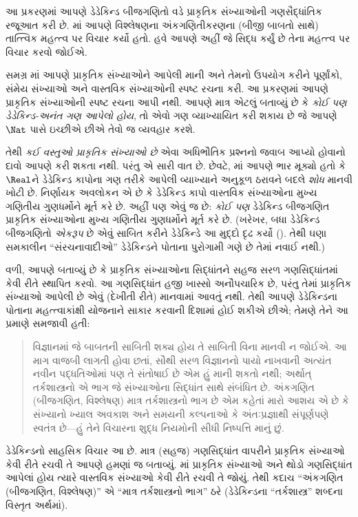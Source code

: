 \begingroup
\makeatletter{}\makeatother


\label{guunit:OLP-0053}


આ પ્રકરણમાં આપણે ડેડેકિન્ડ બીજગણિતો વડે પ્રાકૃતિક સંખ્યાઓની
ગણસૈદ્ધાંતિક રજૂઆત કરી છે. માં આપણે
વિશ્લેષણના અંકગણિતીકરણના (બીજી બાબતો સાથે) તાત્ત્વિક મહત્ત્વ પર
વિચાર કર્યો હતો. હવે આપણે અહીં જે સિદ્ધ કર્યું છે તેના મહત્ત્વ પર
વિચાર કરવો જોઈએ.

સમગ્ર માં આપણે પ્રાકૃતિક સંખ્યાઓને આપેલી
માની અને તેમનો ઉપયોગ કરીને પૂર્ણાંકો, સંમેય સંખ્યાઓ અને વાસ્તવિક
સંખ્યાઓની સ્પષ્ટ રચના કરી. આ પ્રકરણમાં આપણે પ્રાકૃતિક સંખ્યાઓની સ્પષ્ટ
રચના આપી નથી. આપણે માત્ર એટલું બતાવ્યું છે કે \emph{કોઈ પણ
ડેડેકિન્ડ-અનંત ગણ આપેલો હોય}, તો એવો ગણ વ્યાખ્યાયિત કરી શકાય છે જે
આપણે~$\Nat$ પાસે ઇચ્છીએ છીએ તેવો જ વ્યવહાર કરશે.

તેથી \emph{કઈ વસ્તુઓ પ્રાકૃતિક સંખ્યાઓ છે} એવા અધિભૌતિક પ્રશ્નનો
જવાબ આપ્યો હોવાનો દાવો આપણે કરી શકતા નથી. પરંતુ એ સારી વાત છે. છેવટે,
માં આપણે ભાર મૂક્યો હતો કે
$\Real$ને ડેડેકિન્ડ કાપોના ગણ તરીકે આપેલી વ્યાખ્યાને અનુકૂળ ઠરાવને
બદલે \emph{શોધ} માનવી ખોટી છે. નિર્ણાયક અવલોકન એ છે કે ડેડેકિન્ડ
કાપો વાસ્તવિક સંખ્યાઓના મુખ્ય ગણિતીય ગુણધર્મોને મૂર્ત કરે છે. અહીં
પણ એવું જ છે: \emph{કોઈ પણ} ડેડેકિન્ડ બીજગણિત પ્રાકૃતિક સંખ્યાઓના
મુખ્ય ગણિતીય ગુણધર્મોને મૂર્ત કરે છે. (ખરેખર, બધા ડેડેકિન્ડ બીજગણિતો
\emph{એકરૂપ} છે એવું સાબિત કરીને ડેડેકિન્ડે આ મુદ્દો દૃઢ કર્યો
(\citeyear[Theorems
132--3]{Dedekind1888}). તેથી ઘણા સમકાલીન
``સંરચનાવાદીઓ'' ડેડેકિન્ડને પોતાના પુરોગામી ગણે છે તેમાં નવાઈ નથી.)

 વળી, આપણે બતાવ્યું છે કે પ્રાકૃતિક સંખ્યાઓના સિદ્ધાંતને સહજ સરળ
 ગણસિદ્ધાંતમાં કેવી રીતે સ્થાપિત કરવો. આ ગણસિદ્ધાંત હજી ખાસ્સો
 અનૌપચારિક છે, પરંતુ તેમાં પ્રાકૃતિક સંખ્યાઓ આપેલી છે એવું (દેખીતી
 રીતે) માનવામાં આવતું નથી. તેથી આપણે ડેડેકિન્ડના પોતાના મહત્ત્વાકાંક્ષી
 યોજનાને સાકાર કરવાની દિશામાં હોઈ શકીએ છીએ; તેમણે તેને આ પ્રમાણે
 સમજાવી હતી:
\begin{quote}
	વિજ્ઞાનમાં જે બાબતની સાબિતી શક્ય હોય તે સાબિતી વિના માનવી ન જોઈએ.
	આ માગ વાજબી લાગતી હોવા છતાં, સૌથી સરળ વિજ્ઞાનનો પાયો નાખવાની
	અત્યંત નવીન પદ્ધતિઓમાં પણ તે સંતોષાઈ છે એમ હું માની શકતો નથી;
	અર્થાત્ તર્કશાસ્ત્રનો એ ભાગ જે સંખ્યાઓના સિદ્ધાંત સાથે સંબંધિત છે.
	અંકગણિત (બીજગણિત, વિશ્લેષણ) માત્ર તર્કશાસ્ત્રનો ભાગ છે એમ કહેતાં
	મારો આશય એ છે કે સંખ્યાનો ખ્યાલ અવકાશ અને સમયની કલ્પનાઓ કે
	અંતઃપ્રજ્ઞાથી સંપૂર્ણપણે સ્વતંત્ર છે---હું તેને વિચારના શુદ્ધ
	નિયમોની સીધી નિષ્પત્તિ માનું છું.
	\citep[preface]{Dedekind1888}
\end{quote}
ડેડેકિન્ડનો સાહસિક વિચાર આ છે. માત્ર (સહજ) ગણસિદ્ધાંત વાપરીને
પ્રાકૃતિક સંખ્યાઓ કેવી રીતે રચવી તે આપણે હમણાં જ બતાવ્યું.
માં પ્રાકૃતિક સંખ્યાઓ અને થોડો ગણસિદ્ધાંત
આપેલાં હોય ત્યારે વાસ્તવિક સંખ્યાઓ કેવી રીતે રચવી તે જોયું. તેથી કદાચ
``અંકગણિત (બીજગણિત, વિશ્લેષણ)'' એ ``માત્ર તર્કશાસ્ત્રનો ભાગ'' ઠરે
(ડેડેકિન્ડના ``તર્કશાસ્ત્ર'' શબ્દના વિસ્તૃત અર્થમાં).

